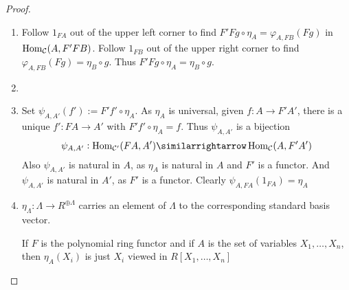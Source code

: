 \documentclass[11pt]{article}
\begin{document}
\begin{proof}
\begin{enumerate}
\item \begin{center}
\end{center}
Follow \(1_{FA}\) out of the upper left corner to find
\(F'Fg\circ\eta_A=\varphi_{A,FB}(Fg)\) in \(\operatorname{Hom}_{\mathcal{C}}(A,F'FB)\). Follow
\(1_{FB}\) out of the upper right corner to find
\(\varphi_{A,FB}(Fg)=\eta_B\circ g\). Thus \(F'Fg\circ\eta_A=\eta_B\circ g\).
\setcounter{enumi}{1}
\item \begin{center}
\end{center}
\setcounter{enumi}{3}
\item Set \(\psi_{A,A'}(f'):=F'f'\circ\eta_A\). As \(\eta_A\) is universal,
given \(f:A\to F'A'\), there is a unique \(f':FA\to A'\) with
\(F'f'\circ\eta_A=f\). Thus \(\psi_{A,A'}\) is a bijection
\begin{equation*}
\psi_{A,A'}:\Hom_{\calc'}(FA,A')\similarrightarrow\Hom_{\calc}(A,F'A')
\end{equation*}
Also \(\psi_{A,A'}\) is natural in \(A\), as \(\eta_A\) is natural in
\(A\) and \(F'\) is a functor. And \(\psi_{A,A'}\) is natural in \(A'\),
as \(F'\) is a functor. Clearly \(\psi_{A,FA}(1_{FA})=\eta_A\)
\item \(\eta_\Lambda:\Lambda\to R^{\oplus\Lambda}\) carries an element of \(\Lambda\) to
the corresponding standard basis vector.

If \(F\) is the polynomial ring functor and if \(A\) is the set of
variables \(X_1,\dots,X_n\), then \(\eta_A(X_i)\) is just \(X_i\) viewed
in \(R[X_1,\dots,X_n]\)
\end{enumerate}
\end{proof}
\end{document}
